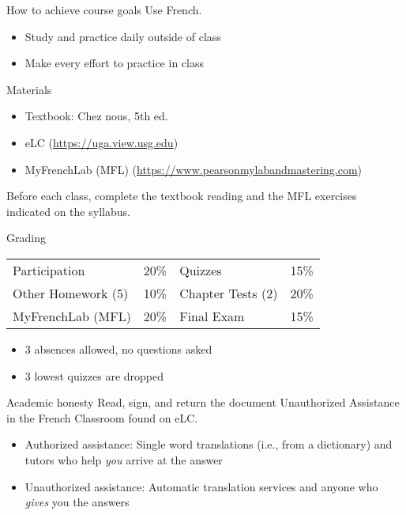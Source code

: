 \documentclass{beamer}
\begin{document}
  \begin{frame}{How to achieve course goals}
    Use French.
    \begin{itemize}
      \item Study and practice \alert{daily} outside of class
      \item Make every effort to practice in class
    \end{itemize}
  \end{frame}

  \begin{frame}{Materials}
    \begin{itemize}
      \item Textbook: Chez nous, 5th ed.
      \item eLC (\url{https://uga.view.usg.edu})
      \item MyFrenchLab (MFL) (\url{https://www.pearsonmylabandmastering.com})
    \end{itemize}
    \alert{Before each class}, complete the textbook reading and the MFL exercises indicated on the syllabus.
  \end{frame}

  \begin{frame}{Grading}
    \begin{center}
      \begin{tabular}{l l | l l}
        Participation      & 20\% & Quizzes           & 15\% \\
        Other Homework (5) & 10\% & Chapter Tests (2) & 20\% \\
        MyFrenchLab (MFL)  & 20\% & Final Exam        & 15\% \\
      \end{tabular}
    \end{center}
    \begin{itemize}
      \item 3 absences allowed, no questions asked
      \item 3 lowest quizzes are dropped
    \end{itemize}
  \end{frame}

  \begin{frame}{Academic honesty}
    Read, sign, and return the document Unauthorized Assistance in the French Classroom found on eLC.
    \begin{itemize}
      \item Authorized assistance: Single word translations (i.e., from a dictionary) and tutors who help \emph{you} arrive at the answer
      \item Unauthorized assistance: Automatic translation services and anyone who \emph{gives} you the answers
    \end{itemize}
  \end{frame}
\end{document}
